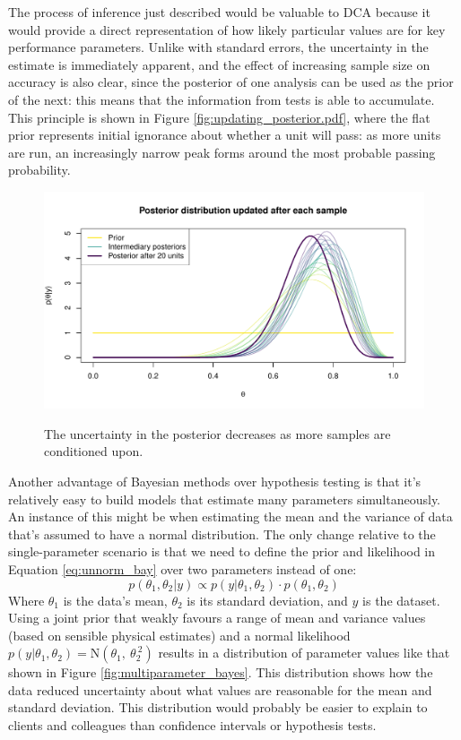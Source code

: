 \documentclass[11pt,a4paper,article]{memoir} %
\begin{document}
The process of inference just described would be valuable to DCA because it would provide a direct representation of how likely particular values are for key performance parameters. Unlike with standard errors, the uncertainty in the estimate is immediately apparent, and the effect of increasing sample size on accuracy is also clear, since the posterior of one analysis can be used as the prior of the next: this means that the information from tests is able to accumulate. This principle is shown in Figure \ref{fig:updating_posterior.pdf}, where the flat prior represents initial ignorance about whether a unit will pass: as more units are run, an increasingly narrow peak forms around the most probable passing probability.
\begin{figure}
\includegraphics[width=\textwidth]{updating_posterior.pdf}
\label{fig:updating_posterior}
\caption{The uncertainty in the posterior decreases as more samples are conditioned upon.}
\end{figure}
\par

Another advantage of Bayesian methods over hypothesis testing is that it's relatively easy to build models that estimate many parameters simultaneously. An instance of this might be when estimating the mean and the variance of data that's assumed to have a normal distribution. The only change relative to the single-parameter scenario is that we need to define the prior and likelihood in Equation \ref{eq:unnorm_bay} over two parameters instead of one:
\begin{equation}
	p(\theta_1, \theta_2 | y) \propto p(y|\theta_1, \theta_2) \cdot p(\theta_1, \theta_2)
\end{equation}
Where $\theta_1$ is the data's mean, $\theta_2$ is its standard deviation, and $y$ is the dataset. Using a joint prior that weakly favours a range of mean and variance values (based on sensible physical estimates) and a normal likelihood $p(y|\theta_1, \theta_2) = \text{N}(\theta_1, \ \theta_2^{\ 2})$ results in a distribution of parameter values like that shown in Figure \ref{fig:multiparameter_bayes}. This distribution shows how the data reduced uncertainty about what values are reasonable for the mean and standard deviation. This distribution would probably be easier to explain to clients and colleagues than confidence intervals or hypothesis tests.
\end{document}
